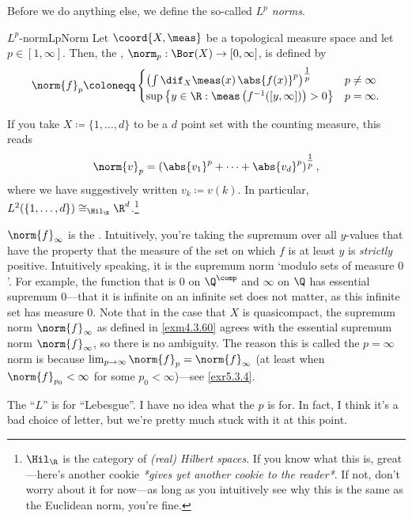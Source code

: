 Before we do anything else, we define the so-called \emph{$L^p$ norms}.
\begin{dfn}{$L^p$-norm}{LpNorm}
Let $\coord{X,\meas}$ be a topological measure space and let $p\in [1,\infty ]$.  Then, the , $\norm _p:\Bor (X)\rightarrow [0,\infty ]$, is defined by
\begin{equation*}
\norm{f}_p\coloneqq \begin{cases}\left( \int \dif _X\meas (x)\, \abs{f(x)}^p\right) ^{\tfrac{1}{p}} & p\neq \infty \\ \sup \left\{ y\in \R :\meas \left( f^{-1}([y,\infty ])\right) >0\right\} & p=\infty .\end{cases}
\end{equation*}
\begin{rmk}
If you take $X\coloneqq \{1,\ldots ,d\}$ to be a $d$ point set with the counting measure, this reads
\begin{equation}
\norm{v}_p=\left( \abs{v_1}^p+\cdots +\abs{v_d}^p\right) ^{\tfrac{1}{p}},
\end{equation}
where we have suggestively written $v_k\coloneqq v(k)$.  In particular, $L^2(\{ 1,\ldots ,d\} )\cong _{\Hil _{\R}}\R ^d$.\footnote{$\Hil _{\R}$ is the category of \emph{(real) Hilbert spaces}.  If you know what this is, great---here's another cookie \emph{*gives yet another cookie to the reader*}.  If not, don't worry about it for now---as long as you intuitively see why this is the same as the Euclidean norm, you're fine.}
\end{rmk}
\begin{rmk}
$\norm{f}_\infty$ is the .  Intuitively, you're taking the supremum over all $y$-values that have the property that the measure of the set on which $f$ is at least $y$ is \emph{strictly} positive.  Intuitively speaking, it is the supremum norm `modulo sets of measure $0$'.  For example, the function that is $0$ on $\Q ^{\comp}$ and $\infty$ on $\Q$ has essential supremum $0$---that it is infinite on an infinite set does not matter, as this infinite set has measure $0$.  Note that in the case that $X$ is quasicompact, the supremum norm $\norm{f}_\infty$ as defined in \cref{exm4.3.60} agrees with the essential supremum norm $\norm{f}_\infty$, so there is no ambiguity.  The reason this is called the $p=\infty$ norm is because $\lim _{p\to \infty}\norm{f}_p=\norm{f}_\infty$ (at least when $\norm{f}_{p_0}<\infty$ for some $p_0<\infty$)---see \cref{exr5.3.4}.
\end{rmk}
\begin{rmk}
The ``$L$'' is for ``Lebesgue''.  I have no idea what the $p$ is for.  In fact, I think it's a bad choice of letter, but we're pretty much stuck with it at this point.
\end{rmk}
\end{dfn}
